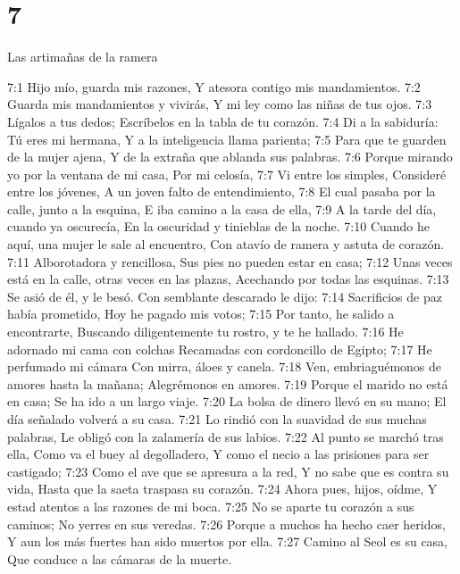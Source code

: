 \chapter{7}

Las artimañas de la ramera  

7:1 Hijo mío, guarda mis razones,  
Y atesora contigo mis mandamientos.  
7:2 Guarda mis mandamientos y vivirás,  
Y mi ley como las niñas de tus ojos.  
7:3 Lígalos a tus dedos;  
Escríbelos en la tabla de tu corazón.  
7:4 Di a la sabiduría: Tú eres mi hermana,  
Y a la inteligencia llama parienta;  
7:5 Para que te guarden de la mujer ajena,  
Y de la extraña que ablanda sus palabras.  
7:6 Porque mirando yo por la ventana de mi casa,  
Por mi celosía,  
7:7 Vi entre los simples,  
Consideré entre los jóvenes,  
A un joven falto de entendimiento,  
7:8 El cual pasaba por la calle, junto a la esquina,  
E iba camino a la casa de ella,  
7:9 A la tarde del día, cuando ya oscurecía, 
En la oscuridad y tinieblas de la noche.  
7:10 Cuando he aquí, una mujer le sale al encuentro,  
Con atavío de ramera y astuta de corazón.  
7:11 Alborotadora y rencillosa,  
Sus pies no pueden estar en casa;  
7:12 Unas veces está en la calle, otras veces en las plazas,  
Acechando por todas las esquinas.  
7:13 Se asió de él, y le besó.  
Con semblante descarado le dijo:  
7:14 Sacrificios de paz había prometido,  
Hoy he pagado mis votos;  
7:15 Por tanto, he salido a encontrarte,  
Buscando diligentemente tu rostro, y te he hallado.  
7:16 He adornado mi cama con colchas  
Recamadas con cordoncillo de Egipto;  
7:17 He perfumado mi cámara  
Con mirra, áloes y canela.  
7:18 Ven, embriaguémonos de amores hasta la mañana;  
Alegrémonos en amores.  
7:19 Porque el marido no está en casa;  
Se ha ido a un largo viaje.  
7:20 La bolsa de dinero llevó en su mano;  
El día señalado volverá a su casa.  
7:21 Lo rindió con la suavidad de sus muchas palabras,  
Le obligó con la zalamería de sus labios.  
7:22 Al punto se marchó tras ella,  
Como va el buey al degolladero,  
Y como el necio a las prisiones para ser castigado;  
7:23 Como el ave que se apresura a la red,  
Y no sabe que es contra su vida,  
Hasta que la saeta traspasa su corazón.  
7:24 Ahora pues, hijos, oídme,  
Y estad atentos a las razones de mi boca.  
7:25 No se aparte tu corazón a sus caminos;  
No yerres en sus veredas.  
7:26 Porque a muchos ha hecho caer heridos,  
Y aun los más fuertes han sido muertos por ella.  
7:27 Camino al Seol es su casa,  
Que conduce a las cámaras de la muerte.  

